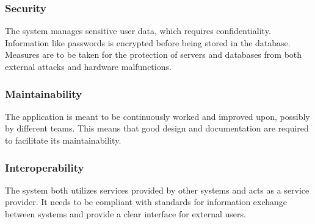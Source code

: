 \subsubsection{Security}
The system manages sensitive user data, which requires confidentiality. Information like passwords is encrypted before being stored in the database.
Measures are to be taken for the protection of servers and databases from both external attacks and hardware malfunctions.


\subsubsection{Maintainability}
The application is meant to be continuously worked and improved upon, possibly by different teams. This means that good design and documentation are required to facilitate its maintainability.

\subsubsection{Interoperability}
The system both utilizes services provided by other systems and acts as a service provider. It needs to be compliant with standards for information exchange between systems and provide a clear interface for external users.
